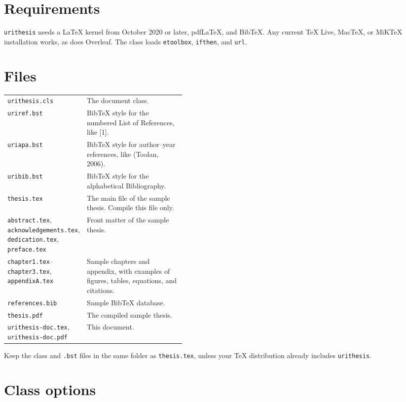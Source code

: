 \documentclass[11pt]{article}
\newcommand\cls{\texttt{urithesis}}
\newcommand\file[1]{\texttt{#1}}
\begin{document}
\section{Requirements}

\cls{} needs a \LaTeX{} kernel from October 2020 or later, pdf\LaTeX, and
Bib\TeX.
Any current \TeX{} Live, Mac\TeX, or MiK\TeX{} installation works, as does
Overleaf.
The class loads \texttt{etoolbox}, \texttt{ifthen}, and \texttt{url}.

\section{Files}

\noindent
\begin{tabularx}{\linewidth}{@{}>{\raggedright\arraybackslash}p{0.42\linewidth}X@{}}
\toprule
\file{urithesis.cls} & The document class. \\
\file{uriref.bst} & Bib\TeX{} style for the numbered List of References, like [1]. \\
\file{uriapa.bst} & Bib\TeX{} style for author--year references, like (Toolan, 2006). \\
\file{uribib.bst} & Bib\TeX{} style for the alphabetical Bibliography. \\
\midrule
\file{thesis.tex} & The main file of the sample thesis. Compile this file only. \\
\file{abstract.tex}, \file{acknowledgements.tex}, \file{dedication.tex}, \file{preface.tex}
  & Front matter of the sample thesis. \\
\file{chapter1.tex}--\file{chapter3.tex}, \file{appendixA.tex}
  & Sample chapters and appendix, with examples of figures, tables,
    equations, and citations. \\
\file{references.bib} & Sample Bib\TeX{} database. \\
\file{thesis.pdf} & The compiled sample thesis. \\
\file{urithesis-doc.tex}, \file{urithesis-doc.pdf} & This document. \\
\bottomrule
\end{tabularx}

\medskip
\noindent Keep the class and \file{.bst} files in the same folder as
\file{thesis.tex}, unless your \TeX{} distribution already includes \cls.

\section{Class options}\label{sec:options}
\end{document}
